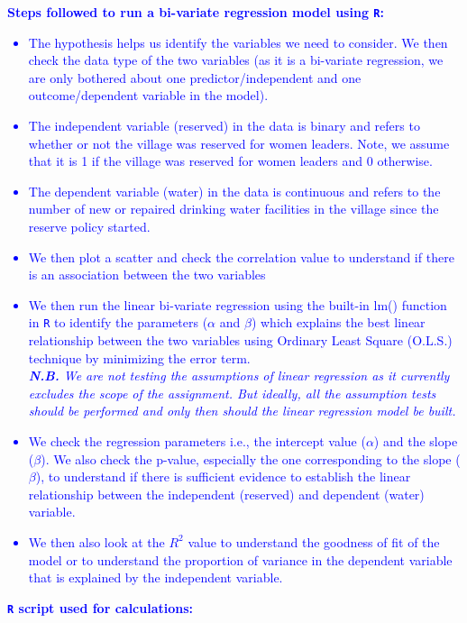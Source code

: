 \documentclass[12pt,letterpaper]{article}
\begin{document}
\begin{enumerate}
\textcolor{blue}{
	\textbf{Steps followed to run a bi-variate regression model using \texttt{R}:}
	\begin{itemize}
		\item The hypothesis helps us identify the variables we need to consider. We then check the data type of the two variables (as it is a bi-variate regression, we are only bothered about one predictor/independent and one outcome/dependent variable in the model).
		\item The independent variable (reserved) in the data is binary and refers to whether or not the village was reserved for women leaders. Note, we assume that it is 1 if the village was reserved for women leaders and 0 otherwise.
		\item The dependent variable (water) in the data is continuous and refers to the number of new or repaired drinking water facilities in the village since the reserve policy started.
		\item We then plot a scatter and check the correlation value to understand if there is an association between the two variables
		\item We then run the linear bi-variate regression using the built-in lm() function in \texttt{R} to identify the parameters ($\alpha$ and $\beta$) which explains the best linear relationship between the two variables using Ordinary Least Square (O.L.S.) technique by minimizing the error term.\\
		\textit{\textbf{N.B.} We are not testing the assumptions of linear regression as it currently excludes the scope of the assignment. But ideally, all the assumption tests should be performed and only then should the linear regression model be built.}
		\item We check the regression parameters i.e., the intercept value ($\alpha$) and the slope ($\beta$). We also check the p-value, especially the one corresponding to the slope ($\beta$), to understand if there is sufficient evidence to establish the linear relationship between the independent (reserved) and dependent (water) variable.
		\item We then also look at the $R^2$ value to understand the goodness of fit of the model or to understand the proportion of variance in the dependent variable that is explained by the independent variable.
	\end{itemize}
}

\vspace{0.2cm}
\textcolor{blue}{
	\textbf{\texttt{R} script used for calculations:}
}


\end{enumerate}
\end{document}
